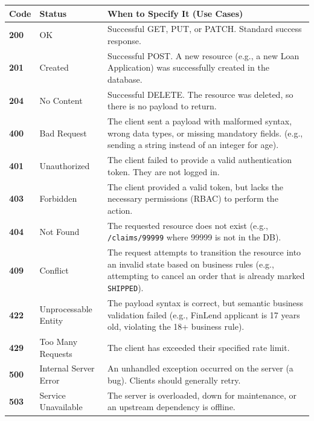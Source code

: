 \begin{longtable}[]{@{}
  >{\raggedright\arraybackslash}p{}
  >{\raggedright\arraybackslash}p{}
  >{\raggedright\arraybackslash}p{}@{}}
\toprule\noalign{}
\begin{minipage}[b]{\linewidth}\raggedright
Code
\end{minipage} & \begin{minipage}[b]{\linewidth}\raggedright
Status
\end{minipage} & \begin{minipage}[b]{\linewidth}\raggedright
When to Specify It (Use Cases)
\end{minipage} \\
\midrule\noalign{}
\endhead
\bottomrule\noalign{}
\endlastfoot
\textbf{200} & OK & Successful GET, PUT, or PATCH. Standard success
response. \\
\textbf{201} & Created & Successful POST. A new resource (e.g., a new
Loan Application) was successfully created in the database. \\
\textbf{204} & No Content & Successful DELETE. The resource was deleted,
so there is no payload to return. \\
\textbf{400} & Bad Request & The client sent a payload with malformed
syntax, wrong data types, or missing mandatory fields. (e.g., sending a
string instead of an integer for age). \\
\textbf{401} & Unauthorized & The client failed to provide a valid
authentication token. They are not logged in. \\
\textbf{403} & Forbidden & The client provided a valid token, but lacks
the necessary permissions (RBAC) to perform the action. \\
\textbf{404} & Not Found & The requested resource does not exist (e.g.,
\texttt{/claims/99999} where 99999 is not in the DB). \\
\textbf{409} & Conflict & The request attempts to transition the
resource into an invalid state based on business rules (e.g., attempting
to cancel an order that is already marked \texttt{SHIPPED}). \\
\textbf{422} & Unprocessable Entity & The payload syntax is correct, but
semantic business validation failed (e.g., FinLend applicant is 17 years
old, violating the 18+ business rule). \\
\textbf{429} & Too Many Requests & The client has exceeded their
specified rate limit. \\
\textbf{500} & Internal Server Error & An unhandled exception occurred
on the server (a bug). Clients should generally retry. \\
\textbf{503} & Service Unavailable & The server is overloaded, down for
maintenance, or an upstream dependency is offline. \\
\end{longtable}

